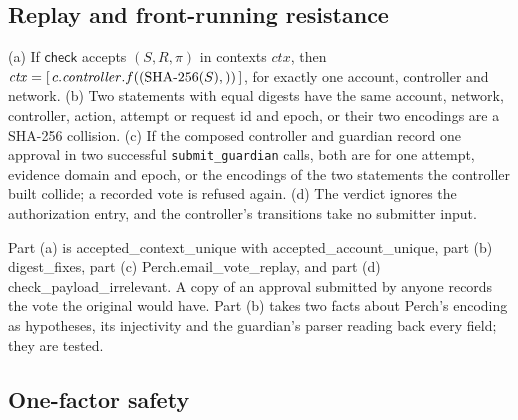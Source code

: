 \subsection{Replay and front-running resistance}

\begin{theorem}\label{thm:replay}
(a) If $\mathsf{check}$ accepts $(S, R, \pi)$ in contexts $\mathit{ctx}$, then
$\mathit{ctx} = [\,c.\mathit{controller}.f((\mathrm{SHA\text{-}256}(S),))\,]$, for exactly one
account, controller and network. (b) Two statements with equal digests have
the same account, network, controller, action, attempt or request id and
epoch, or their two encodings are a SHA-256 collision. (c) If the composed
controller and guardian record one approval in two successful
\texttt{submit\_guardian} calls, both are for one attempt, evidence domain
and epoch, or the encodings of the two statements the controller built
collide; a recorded vote is refused again. (d) The verdict ignores the
authorization entry, and the controller's transitions take no submitter
input.
\end{theorem}
Part (a) is \textsf{accepted\_context\_unique} with
\textsf{accepted\_account\_unique}, part (b) \textsf{digest\_fixes},
part (c) \textsf{Perch.\allowbreak email\_vote\_replay}, and part (d)
\textsf{check\_payload\_irrelevant}. A copy
of an approval submitted by anyone records the vote the original would
have. Part (b) takes two facts about Perch's encoding as hypotheses, its
injectivity and the guardian's parser reading back every field; they are
tested.

\subsection{One-factor safety}

